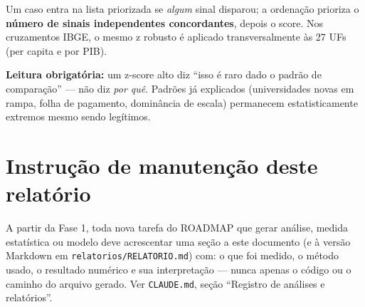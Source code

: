 \documentclass[11pt,a4paper]{article}
\begin{document}
Um caso entra na lista priorizada se \emph{algum} sinal disparou; a
ordenação prioriza o \textbf{número de sinais independentes
concordantes}, depois o score. Nos cruzamentos IBGE, o mesmo z robusto é
aplicado transversalmente às 27 UFs (per capita e por PIB).

\textbf{Leitura obrigatória:} um z-score alto diz ``isso é raro dado o
padrão de comparação'' --- não diz \emph{por quê}. Padrões já explicados
(universidades novas em rampa, folha de pagamento, dominância de escala)
permanecem estatisticamente extremos mesmo sendo legítimos.

\section*{Instrução de manutenção deste relatório}

A partir da Fase 1, toda nova tarefa do ROADMAP que gerar análise, medida
estatística ou modelo deve acrescentar uma seção a este documento (e à
versão Markdown em \texttt{relatorios/RELATORIO.md}) com: o que foi medido,
o método usado, o resultado numérico e sua interpretação --- nunca apenas o
código ou o caminho do arquivo gerado. Ver \texttt{CLAUDE.md}, seção
``Registro de análises e relatórios''.
\end{document}
